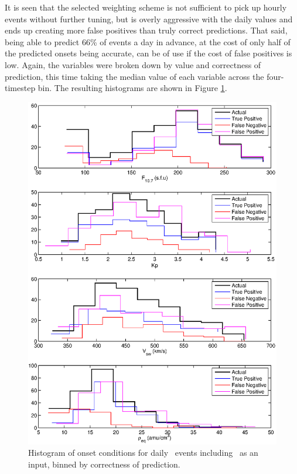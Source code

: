 It is seen that the selected weighting scheme is not sufficient to pick up hourly events without further tuning, but is overly aggressive with the daily values and ends up creating more false positives than truly correct predictions. That said, being able to predict 66\% of events a day in advance, at the cost of only half of the predicted onsets being accurate, can be of use if the cost of false positives is low. Again, the variables were broken down by value and correctness of prediction, this time taking the median value of each variable across the four-timestep bin. The resulting histograms are shown in Figure \ref{fig:OnsetWithreq-hist-full}.

\begin{figure}[htp!]
	\centering
	\includegraphics[width=1\linewidth]{Figures/CH5/NNBinaryOnset-full-daily-withreq-hist.eps}
	\caption{Histogram of onset conditions for daily \req\ events including \req\ as an input, binned by correctness of prediction.}
	\label{fig:OnsetWithreq-hist-full}
\end{figure}

